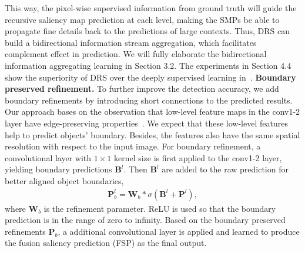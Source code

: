 \documentclass[10pt,twocolumn,letterpaper]{article}
\begin{document}
This way, the pixel-wise supervised information from ground truth will guide the recursive saliency map prediction at each level, making the SMPs be able to propagate fine details back to the predictions of large contexts.
Thus, DRS can build a bidirectional information stream aggregation, which facilitates complement effect in prediction.
We will fully elaborate the bidirectional information aggregating learning in Section 3.2.
The experiments in Section 4.4 show the superiority of DRS over the deeply supervised learning in~\cite{xie2015holistically}.
\vspace{-5mm}
{\flushleft\textbf{Boundary preserved refinement.}}
To further improve the detection accuracy, we add boundary refinements by introducing short connections to the predicted results.
Our approach bases on the observation that low-level feature maps in the conv1-2 layer have edge-preserving properties~\cite{zeiler2014visualizing,mahendran2015understanding}.
We expect that these low-level features help to predict objects' boundary.
Besides, the features also have the same spatial resolution with respect to the input image.
For boundary refinement, a convolutional layer with $1\times1$ kernel size is first applied to the conv1-2 layer, yielding
boundary predictions $\textbf{B}^{l}$.
Then $\textbf{B}^{l}$ are added to the raw prediction for better aligned object boundaries,
\begin{equation}
  \label{equ:equ3}
\begin{aligned}
 \textbf{P}_{b}^{l} = \textbf{W}_{b}*\sigma(\textbf{B}^{l}+\textbf{P}^{l}),
\end{aligned}
\end{equation}
where $\textbf{W}_{b}$ is the refinement parameter.
ReLU is used so that the boundary prediction is in the range of zero to infinity.
Based on the boundary preserved refinements $\textbf{P}_{b}$, a additional convolutional layer is applied and learned to produce the fusion saliency prediction (FSP) as the final output.
\end{document}
